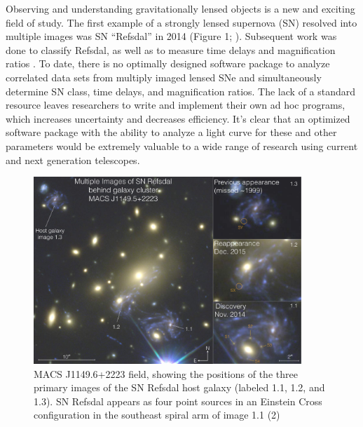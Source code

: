 \thispagestyle{fancy}
\lhead{}
\rhead{}
\renewcommand{\headrulewidth}{1pt}
\renewcommand{\footrulewidth}{0pt}
\newcommand{\packageName}{\textit{SNTD}}
\fancyfoot[C]{}

\pagestyle{fancy}

Observing and understanding gravitationally lensed objects is a new
and exciting field of study. The first example of a strongly lensed
supernova (SN) resolved into multiple images was SN ``Refsdal'' in
2014 (Figure 1; \citet{Kelly:2015a}). Subsequent work was done to
classify Refsdal, as well as to measure time delays and magnification
ratios \citep{Kelly:2016,Rodney:2016}. To date, there is no optimally
designed software package to analyze correlated data sets from
multiply imaged lensed SNe and simultaneously determine SN class, time
delays, and magnification ratios. The lack of a standard resource
leaves researchers to write and implement their own ad hoc programs,
which increases uncertainty and decreases efficiency. It's clear that
an optimized software package with the ability to analyze a light
curve for these and other parameters would be extremely valuable to a
wide range of research using current and next generation telescopes.

\begin{figure}[h]
\centering
\includegraphics[width=0.9\textwidth]{refsdal_rodney.pdf}
\caption{
MACS J1149.6+2223 field, showing the positions of the three primary
images of the SN Refsdal host galaxy (labeled 1.1, 1.2, and 1.3). SN
Refsdal appears as four point sources in an Einstein Cross
configuration in the southeast spiral arm of image 1.1 (2)}
\end{figure}


